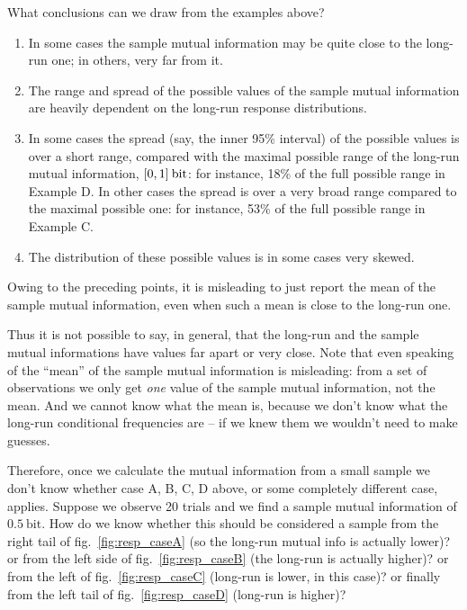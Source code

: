 \documentclass[\ifafour a4paper,12pt,\else a5paper,10pt,\fi%
onecolumn,oneside,article,%
british%
]{memoir}
\theoremstyle{remark}
\theoremstyle{innote}
\DeclarePairedDelimiter\clcl{[}{]}
\renewcommand*{\|}[1][]{\nonscript\,#1\vert\nonscript\;\mathopen{}}
\renewcommand*{\=}{\TextOrMath\texteq\eq}
\newcommand*{\fig}{fig.}%
\newcommand*{\bit}{\mathrm{bit}}
\begin{document}
\clearpage



What conclusions can we draw from the examples above?
\begin{enumerate}[wide,label=(\roman*)]
\item In some cases the sample mutual information may be quite close to the
  long-run one; in others, very far from it.
\item The range and spread of the possible values of the sample mutual
  information are heavily dependent on the long-run response distributions.
\item In some cases the spread (say, the inner 95\% interval) of the
  possible values is over a short range, compared with the maximal possible
  range of the long-run mutual information, $\clcl{0, 1}\:\bit$: for
  instance, 18\% of the full possible range in Example D. In other cases
  the spread is over a very broad range compared to the maximal possible
  one: for instance, 53\% of the full possible range in Example C.
\item The distribution of these possible values is in some cases very
  skewed.
\end{enumerate}

Owing to the preceding points, it is misleading to just report the mean of
the sample mutual information, even when such a mean is close to the
long-run one.

Thus it is not possible to say, in general, that the long-run and the
sample mutual informations have values far apart or very close. Note that even
speaking of the \enquote{mean} of the sample mutual information is
misleading: from a set of observations we only get \emph{one} value of the
sample mutual information, not the mean. And we cannot know what the mean
is, because we don't know what the long-run conditional frequencies are --
if we knew them we wouldn't need to make guesses.

Therefore, once we calculate the mutual information from a small sample we
don't know whether case A, B, C, D above, or some completely different
case, applies. Suppose we observe 20 trials and we find a sample mutual
information of $0.5\:\bit$. How do we know whether this should be
considered a sample from the right tail of \fig~\ref{fig:resp_caseA} (so
the long-run mutual info is actually lower)? or from the left side of
\fig~\ref{fig:resp_caseB} (the long-run is actually higher)? or from the
left of \fig~\ref{fig:resp_caseC} (long-run is lower, in this case)? or
finally from the left tail of \fig~\ref{fig:resp_caseD} (long-run is
higher)?
\end{document}
